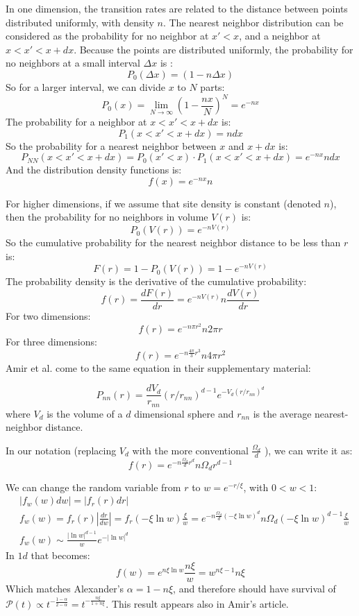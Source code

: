 \documentclass[onecolumn,fleqn,notitlepage,secnumarabic]{revtex4}
\newenvironment{fminipage}%
  {\begin{Sbox}\begin{minipage}}%
  {\end{minipage}\end{Sbox}\fbox{\TheSbox}}
\begin{document}
In one dimension, the transition rates are related to the distance between points distributed uniformly, with density $n$. The nearest neighbor distribution can be considered as the probability for no neighbor at $x'<x$, and a neighbor at $x<x'<x+dx$. Because the points are distributed uniformly, the probability for no neighbors at a small interval $\Delta x$ is :
\[P_0(\Delta x) = (1-n\Delta x) \]
So for a larger interval, we can divide $x$ to $N$ parts:
\[P_0(x) = \lim_{N\rightarrow \infty}(1-\frac{nx}{N})^N = e^{-n x} \]
The probability for a neighbor at $x<x'<x+dx$ is:
\[P_1(x<x'<x+dx) = n dx \]
So the probability for a nearest neighbor between $x$ and $x+dx$ is:
\[P_{NN}(x< x'<x+dx) = P_0(x'<x)\cdot P_1(x<x'<x+dx) = e^{-n x}ndx \]
And the distribution density functions is:
\[ f(x) = e^{-n x}n\]

For higher dimensions, if we assume that site density is constant (denoted $n$), then the probability for no neighbors in volume $V(r)$ is:
\[ P_0( V(r)) = e^{-nV(r)}\]
So the cumulative probability for the nearest neighbor distance to be less than $r$ is:
\[ F (r) = 1-P_0(V(r)) = 1- e^{-nV(r)} \]
The probability density is the derivative of the cumulative probability:
\[ f(r) = \frac{dF(r)}{dr} =   e^{-nV(r)} n \frac{dV(r)}{dr} \]
For two dimensions:
\[ f(r) = e^{-n \pi r^2}n2\pi r \]
For three dimensions:
\[ f(r) = e^{-n \frac{4\pi}{3} r^3}n4\pi r^2 \]
Amir et al. \cite{Amir:2010:PRL} come to the same equation in their supplementary material:

\begin{fminipage}{\textwidth}
\[P_{nn}(r)=\frac{d
V_d}{r_{nn}} {(r/r_{nn})}^{d-1} e^{-V_d {(r/r_{nn})}^d}\] 
where $V_d$ is the volume of a $d$ dimensional sphere and $r_{nn}$ is the
average nearest-neighbor distance.
\end{fminipage}

In our notation (replacing $V_d$ with the more conventional $\frac{\Omega_d}{d}$ ), we can write it as:
\[ f(r) = e^{-n \frac{\Omega_d}{d} r^d} n\Omega_d r^{d-1} \]


We can change the random variable from $r$ to $w= e^{-r/ \xi}$, with $0<w<1$:
\begin{align*}
    &|f_w(w)dw| = |f_r(r)dr| \\
    &f_w(w) = f_r(r)\left|\frac{dr}{dw}\right| = f_r(-\xi \ln w)\frac{\xi}{w} = e^{-n \frac{\Omega_d}{d} (-\xi\ln w)^d} n\Omega_d (-\xi\ln w)^{d-1}\frac{\xi}{w} \\
    &f_w(w) \sim \frac{|\ln w|^{d-1}}{w} e^{-|\ln w|^d}
\end{align*}
In $1d$ that becomes:
\[ f(w)= e^{n \xi\ln w} \frac{n\xi}{w} = w^{n\xi-1}n\xi\]
Which matches Alexander's $\alpha = 1-n\xi$, and therefore should have survival of $\mathcal{P}(t)\propto t^{-\frac{1-\alpha}{2-\alpha}}= t^{-\frac{n\xi}{1+n\xi}}$. This result appears also in Amir's article.
\end{document}
